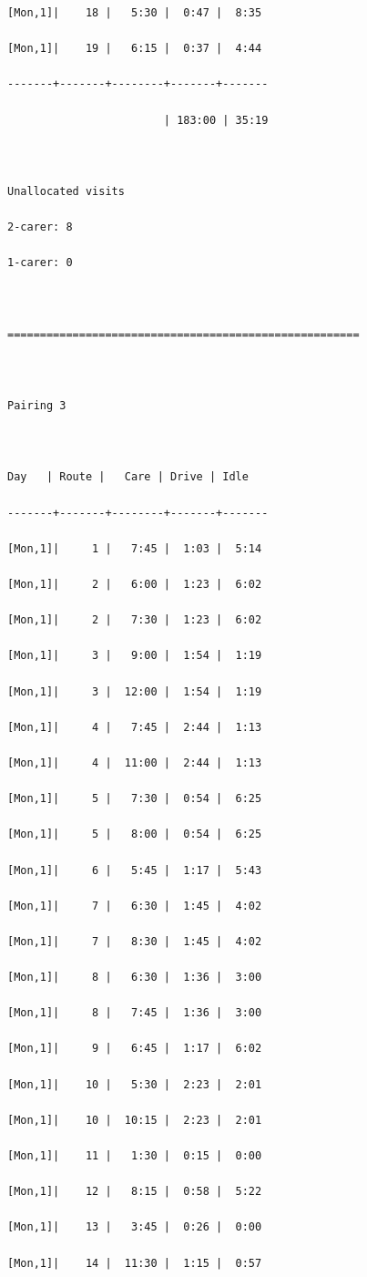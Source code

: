 \documentclass[11pt,twoside]{article}
\numberwithin{Theorem}{section}
\numberwithin{Definition}{section}
\numberwithin{Lemma}{section}
\numberwithin{Algorithm}{section}
\numberwithin{equation}{section}
\begin{document}
\begin{verbatim}
[Mon,1]|    18 |   5:30 |  0:47 |  8:35

[Mon,1]|    19 |   6:15 |  0:37 |  4:44

-------+-------+--------+-------+-------

                        | 183:00 | 35:19

 

Unallocated visits

2-carer: 8

1-carer: 0

 

======================================================

 

Pairing 3

 

Day   | Route |   Care | Drive | Idle

-------+-------+--------+-------+-------

[Mon,1]|     1 |   7:45 |  1:03 |  5:14

[Mon,1]|     2 |   6:00 |  1:23 |  6:02

[Mon,1]|     2 |   7:30 |  1:23 |  6:02

[Mon,1]|     3 |   9:00 |  1:54 |  1:19

[Mon,1]|     3 |  12:00 |  1:54 |  1:19

[Mon,1]|     4 |   7:45 |  2:44 |  1:13

[Mon,1]|     4 |  11:00 |  2:44 |  1:13

[Mon,1]|     5 |   7:30 |  0:54 |  6:25

[Mon,1]|     5 |   8:00 |  0:54 |  6:25

[Mon,1]|     6 |   5:45 |  1:17 |  5:43

[Mon,1]|     7 |   6:30 |  1:45 |  4:02

[Mon,1]|     7 |   8:30 |  1:45 |  4:02

[Mon,1]|     8 |   6:30 |  1:36 |  3:00

[Mon,1]|     8 |   7:45 |  1:36 |  3:00

[Mon,1]|     9 |   6:45 |  1:17 |  6:02

[Mon,1]|    10 |   5:30 |  2:23 |  2:01

[Mon,1]|    10 |  10:15 |  2:23 |  2:01

[Mon,1]|    11 |   1:30 |  0:15 |  0:00

[Mon,1]|    12 |   8:15 |  0:58 |  5:22

[Mon,1]|    13 |   3:45 |  0:26 |  0:00

[Mon,1]|    14 |  11:30 |  1:15 |  0:57


\end{verbatim}
\end{document}
